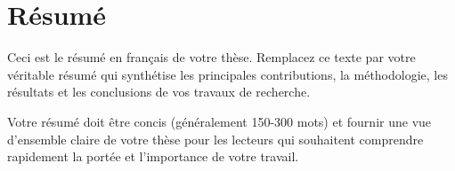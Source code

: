 \pagestyle{empty}

\chapter*{Résumé}


Ceci est le résumé en français de votre thèse. Remplacez ce texte par votre véritable résumé qui synthétise les principales contributions, la méthodologie, les résultats et les conclusions de vos travaux de recherche.

Votre résumé doit être concis (généralement 150-300 mots) et fournir une vue d'ensemble claire de votre thèse pour les lecteurs qui souhaitent comprendre rapidement la portée et l'importance de votre travail.

\newpage
